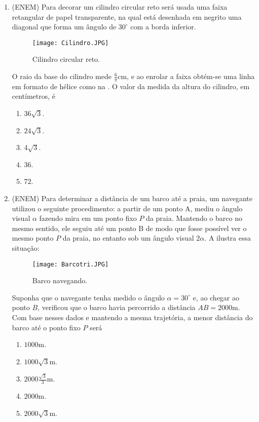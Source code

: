 \label{trigonometria-exercicios}
\begin{enumerate}

\item{}
(ENEM) Para decorar um cilindro circular reto será usada uma faixa retangular de papel transparente, na qual está desenhada em negrito uma diagonal que forma um ângulo de $30^\circ$ com a borda inferior.
\begin{figure}[H]
    \centering
    \texttt{[image: Cilindro.JPG]}
    \caption{Cilindro circular reto.}
    \label{Cilindro}
\end{figure}
O raio da base do cilindro mede $\frac{6}{\pi}$cm, e ao enrolar a faixa obtém-se uma linha em formato de hélice como na . O valor da medida da altura do cilindro, em centímetros, é
\begin{enumerate}
    \item $36\sqrt{3}$.
    \item $24\sqrt{3}$.
    \item $4\sqrt{3}$.
    \item $36$.
    \item $72$.
\end{enumerate} 

\item{}
(ENEM) Para determinar a distância de um barco até a praia, um navegante utilizou o seguinte procedimento: a partir de um ponto A, mediu o ângulo visual $\alpha$ fazendo mira em um ponto fixo $P$ da praia. Mantendo o barco no mesmo sentido, ele seguiu até um ponto B de modo que fosse possível ver o mesmo ponto $P$ da praia, no entanto sob um ângulo visual $2\alpha$. A  ilustra essa situação:
\begin{figure}[H]
    \centering
    \texttt{[image: Barcotri.JPG]}
    \caption{Barco navegando.}
    \label{Barco}
\end{figure}
Suponha que o navegante tenha medido o ângulo $\alpha= 30^\circ$ e, ao chegar ao ponto $B$, verificou que o barco havia percorrido a distância $AB = 2 000$m. Com base nesses dados e mantendo a mesma trajetória, a menor distância do barco até o ponto fixo $P$ será
\begin{enumerate}
    \item $1000$m.
    \item $1000\sqrt{3}$m.
    \item $2000\frac{\sqrt{3}}{3}$m.
    \item $2000$m.
    \item $2000\sqrt{3}$m.
\end{enumerate}


\end{enumerate}
